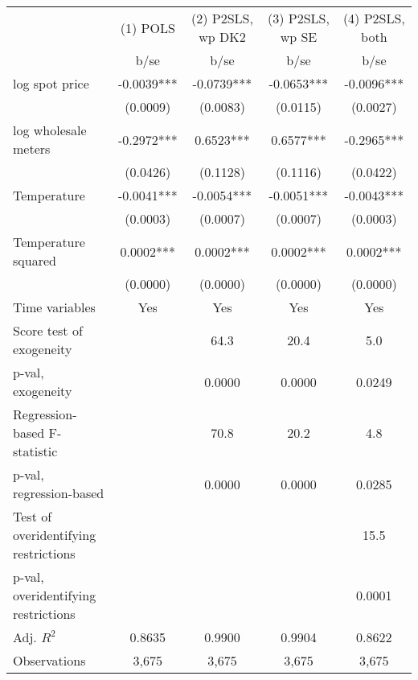 \begin{tabular}{lcccc}\toprule
                    &    (1) POLS   &(2) P2SLS, wp DK2   &(3) P2SLS, wp SE   &(4) P2SLS, both   \\
                    &        b/se   &        b/se   &        b/se   &        b/se   \\
\midrule
log spot price      &     -0.0039***&     -0.0739***&     -0.0653***&     -0.0096***\\
                    &    (0.0009)   &    (0.0083)   &    (0.0115)   &    (0.0027)   \\
log wholesale meters&     -0.2972***&      0.6523***&      0.6577***&     -0.2965***\\
                    &    (0.0426)   &    (0.1128)   &    (0.1116)   &    (0.0422)   \\
Temperature         &     -0.0041***&     -0.0054***&     -0.0051***&     -0.0043***\\
                    &    (0.0003)   &    (0.0007)   &    (0.0007)   &    (0.0003)   \\
Temperature squared &      0.0002***&      0.0002***&      0.0002***&      0.0002***\\
                    &    (0.0000)   &    (0.0000)   &    (0.0000)   &    (0.0000)   \\
Time variables      &         Yes   &         Yes   &         Yes   &         Yes   \\
\midrule
Score test of exogeneity&               &        64.3   &        20.4   &         5.0   \\
p-val, exogeneity   &               &      0.0000   &      0.0000   &      0.0249   \\
Regression-based F-statistic&               &        70.8   &        20.2   &         4.8   \\
p-val, regression-based&               &      0.0000   &      0.0000   &      0.0285   \\
Test of overidentifying restrictions&               &               &               &        15.5   \\
p-val, overidentifying restrictions&               &               &               &      0.0001   \\
Adj. \(R^2\)        &      0.8635   &      0.9900   &      0.9904   &      0.8622   \\
Observations        &       3,675   &       3,675   &       3,675   &       3,675   \\
\bottomrule\end{tabular}
